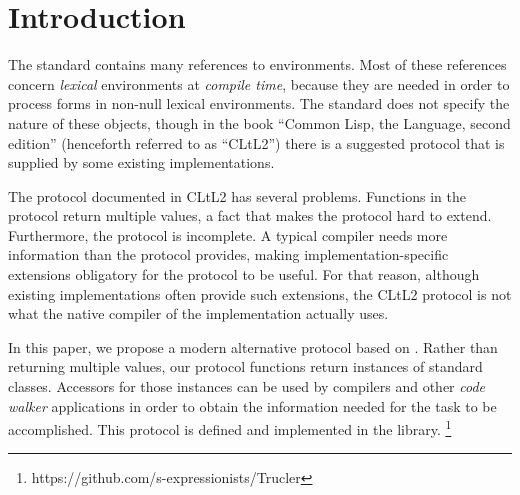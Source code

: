 \section{Introduction}

The \commonlisp{} standard \cite{ansi:common:lisp} contains many
references to environments.  Most of these references concern
\emph{lexical} environments at \emph{compile time}, because they are
needed in order to process forms in non-null lexical environments.
The standard does not specify the nature of these objects, though in
the book ``Common Lisp, the Language, second edition''
\cite{Steele:1990:CLL:95411} (henceforth referred to as ``CLtL2'')
there is a suggested protocol that is supplied by some existing
\commonlisp{} implementations.

The protocol documented in CLtL2 has several problems.  Functions in
the protocol return multiple values, a fact that makes the protocol
hard to extend.  Furthermore, the protocol is incomplete.  A typical
compiler needs more information than the protocol provides, making
implementation-specific extensions obligatory for the protocol to be
useful.  For that reason, although existing \commonlisp{}
implementations often provide such extensions, the CLtL2 protocol is
not what the native compiler of the implementation actually uses.

In this paper, we propose a modern alternative protocol based on
\clos{}.  Rather than returning multiple values, our protocol
functions return instances of standard classes.  Accessors for those
instances can be used by compilers and other \emph{code walker}
applications in order to obtain the information needed for the task to
be accomplished.  This protocol is defined and implemented in the
\trucler{} library.%
\footnote{https://github.com/s-expressionists/Trucler}



